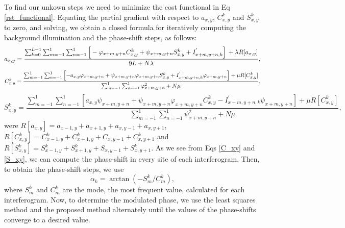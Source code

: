 \documentclass[letterpaper,12pt]{article}   %
\begin{document}
To find our unkown steps we need to minimize the cost functional in Eq 
\ref{rst_functional}. Equating the partial gradient with respect to $a_{x,y}$, 
$C_{x,y}^k$ and $S_{x,y}^k$ to zero, and solving, we obtain a closed formula for 
iteratively computing the background illumination and the phase-shift steps, as follows: 
\begin{equation}
	a_{x,y} = \frac{ \sum_{k=0}^{L-1} \sum_{m=-1}^{1} \sum_{n=-1}^{1} \left[\\
	-\varphi_{x+m,y+n}C_{x,y}^k+\psi_{x+m,y+n}S_{x,y}^k+I_{x+m,y+n,k}^{'} \right] \\
	+ \lambda R[a_{x,y}] }
	{ 9L + N \lambda},
\end{equation}
\begin{equation}\label{C_xy}
	C_{x,y}^k = \frac{ \sum_{m=-1}^{1} \sum_{n=-1}^{1} \left[ -a_{x,y} \varphi_{x+m,y+n}+
	\psi_{x+m,y+n} \varphi_{x+m,y+n} S_{x,y}^k +\\ 		I_{x+m,y+n,k}^{'}
	\varphi_{x+m,y+n} \right] + \mu R[C_{x,y}^k] }
	{ \sum_{m=-1}^{1} \sum_{n=-1}^{1} \varphi_{x+m,y+n}^2 + N \mu },
\end{equation}
\begin{equation}\label{S_xy}
	S_{x,y}^k = \frac{ \sum_{m=-1}^{1} \sum_{n=-1}^{1} \left[ a_{x,y} \psi_{x+m,y+n} +
	\psi_{x+m,y+n} \varphi_{x+m,y+n} C_{x,y}^k-I_{x+m,y+n,k}^{'} \psi_{x+m,y+n} \right] 
	+ \mu R[C_{x,y}^k]}
	{ \sum_{m=-1}^{1} \sum_{n=-1}^{1} \psi_{x+m,y+n}^2 + N \mu},
\end{equation}
were $R[a_{x,y}]=a_{x-1,y}+a_{x+1,y}+a_{x,y-1}+a_{x,y+1}$, $R[C_{x,y}^k]=C_{x-1,y}^k+C_{x+1,y}^k+C_{x,y-1}+C_{x,y+1}^k$ and $R[S_{x,y}^k]=S_{x-1,y}^k+S_{x+1,y}^k+S_{x,y-1}+S_{x,y+1}^k$. As we see from Eqs \ref{C_xy} and \ref{S_xy}, we can compute the phase-shift in every site
of each interferogram. Then, to obtain the phase-shift steps, we use
\begin{equation}
	\alpha_k = \arctan(-S_m^k/C_m^k),
\end{equation}
where $S_m^k$ and $C_m^k$ are the mode, the most frequent value, calculated for each
interferogram. Now, to determine the modulated phase, we use the least squares method and 
the proposed method alternately until the values ​​of the phase-shifts converge to a desired 
value.

\end{document}
